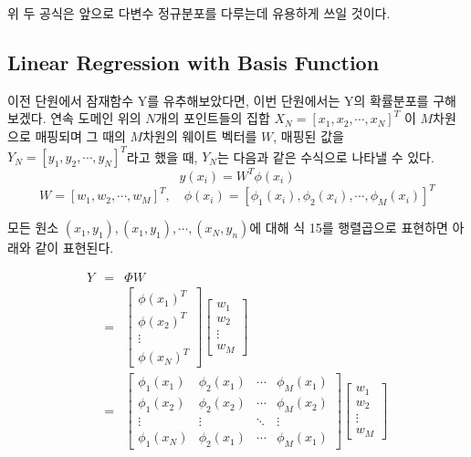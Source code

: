 \documentclass[a4paper]{oblivoir}
\begin{document}
위 두 공식은 앞으로 다변수 정규분포를 다루는데 유용하게 쓰일 것이다.\\

\subsection{Linear Regression with Basis Function}

이전 단원에서 잠재함수 Y를 유추해보았다면, 이번 단원에서는 Y의 확률분포를 구해보겠다. 연속 도메인 위의 $N$개의 포인트들의 집합 $X_{N} = [x_{1},x_{2}, \cdots , x_{N}]^{T}$ 이 $M$차원으로 매핑되며 그 때의 $M$차원의 웨이트 벡터를 $W$, 매핑된 값을 $Y_{N} = [y_{1},y_{2}, \cdots , y_{N}]^{T}$라고 했을 때, $Y_{N}$는 다음과 같은 수식으로 나타낼 수 있다.\\

\begin{equation}
y(x_{i}) = W^{T}\phi (x_{i})
\label{eq:12-14}
\end{equation} 
\begin{equation}
W = [w_{1},w_{2}, \cdots , w_{M}]^{T}, \quad \phi(x_{i}) =[\phi_{1}(x_{i}), \phi_{2}(x_{i}), \cdots, \phi_{M}(x_{i})]^{T}
\label{eq:12-15}
\end{equation} 


모든 원소 $(x_{1},y_{1}),(x_{1},y_{1}), \cdots, (x_{N},y_{n})$에 대해 식 15를 행렬곱으로 표현하면 아래와 같이 표현된다.

\begin{eqnarray}
Y & = & \Phi W\nonumber\\
& = & \begin{bmatrix} \phi(x_{1})^{T} \\ \phi(x_{2})^{T} \\ \vdots \\ \phi(x_{N})^{T} \end{bmatrix} \begin{bmatrix} w_{1} \\ w_{2} \\ \vdots \\ w_{M}
\end{bmatrix}\nonumber\\
& = & \begin{bmatrix} \phi_{1}(x_{1}) & \phi_{2}(x_{1}) & \cdots & \phi_{M}(x_{1})  \\ \phi_{1}(x_{2}) & \phi_{2}(x_{2}) & \cdots & \phi_{M}(x_{2}) \\ \vdots & \vdots & \ddots & \vdots\\ \phi_{1}(x_{N}) & \phi_{2}(x_{1}) & \cdots & \phi_{M}(x_{1}) \end{bmatrix} \begin{bmatrix} w_{1} \\ w_{2} \\ \vdots \\ w_{M}
\end{bmatrix}
\end{eqnarray} 
\end{document}
